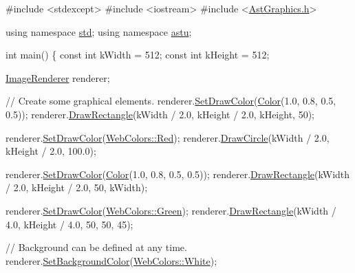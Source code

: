 \begin{DoxyCode}
\textcolor{preprocessor}{#include <stdexcept>}
\textcolor{preprocessor}{#include <iostream>}
\textcolor{preprocessor}{#include <\hyperlink{AstGraphics_8h}{AstGraphics.h}>}

\textcolor{keyword}{using namespace }\hyperlink{namespacestd}{std};
\textcolor{keyword}{using namespace }\hyperlink{namespaceastu}{astu};

\textcolor{keywordtype}{int} main()
\{
  \textcolor{keyword}{const} \textcolor{keywordtype}{int} kWidth = 512;
  \textcolor{keyword}{const} \textcolor{keywordtype}{int} kHeight = 512;

  \hyperlink{classastu_1_1ImageRenderer}{ImageRenderer} renderer;

  \textcolor{comment}{// Create some graphical elements.}
  renderer.\hyperlink{classastu_1_1ImageRenderer_a902cdac5634067b5e78de3f91667d1b9}{SetDrawColor}(\hyperlink{classastu_1_1Color}{Color}(1.0, 0.8, 0.5, 0.5));
  renderer.\hyperlink{classastu_1_1ImageRenderer_a95ed0bcec030e0ab17d0c6abc104eac3}{DrawRectangle}(kWidth / 2.0, kHeight / 2.0, kHeight, 50);

  renderer.\hyperlink{classastu_1_1ImageRenderer_a902cdac5634067b5e78de3f91667d1b9}{SetDrawColor}(\hyperlink{group__gfx__group_gga6f6f9db1751e96b647084ecaedff2409a4f06dbd0c0981a97dd9279788b11a457}{WebColors::Red});
  renderer.\hyperlink{classastu_1_1ImageRenderer_a903b1b78edee5f09b9ee1f604d762c28}{DrawCircle}(kWidth / 2.0, kHeight / 2.0, 100.0);

  renderer.\hyperlink{classastu_1_1ImageRenderer_a902cdac5634067b5e78de3f91667d1b9}{SetDrawColor}(\hyperlink{classastu_1_1Color}{Color}(1.0, 0.8, 0.5, 0.5));
  renderer.\hyperlink{classastu_1_1ImageRenderer_a95ed0bcec030e0ab17d0c6abc104eac3}{DrawRectangle}(kWidth / 2.0, kHeight / 2.0, 50, kWidth);

  renderer.\hyperlink{classastu_1_1ImageRenderer_a902cdac5634067b5e78de3f91667d1b9}{SetDrawColor}(\hyperlink{group__gfx__group_gga6f6f9db1751e96b647084ecaedff2409a384d49f1ac85f826658bccf8f6c778f9}{WebColors::Green});
  renderer.\hyperlink{classastu_1_1ImageRenderer_a95ed0bcec030e0ab17d0c6abc104eac3}{DrawRectangle}(kWidth / 4.0, kHeight / 4.0, 50, 50, 45);

  \textcolor{comment}{// Background can be defined at any time.}
  renderer.\hyperlink{classastu_1_1ImageRenderer_acfb25962b67295325e9209759fcabe2b}{SetBackgroundColor}(\hyperlink{group__gfx__group_gga6f6f9db1751e96b647084ecaedff2409ae2e0a544fd90f604852d4c9564d64b36}{WebColors::White});



\end{DoxyCode}
